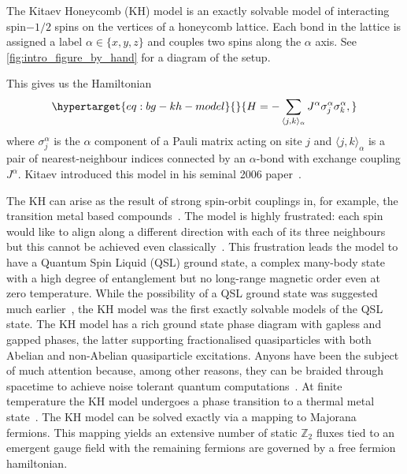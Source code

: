 The Kitaev Honeycomb (KH) model is an exactly solvable model of interacting spin\(-1/2\) spins on the vertices of a honeycomb lattice. Each bond in the lattice is assigned a label \(\alpha \in \{ x, y, z\}\) and couples two spins along the \(\alpha\) axis. See \cref{fig:intro_figure_by_hand} for a diagram of the setup.

This gives us the Hamiltonian \begin{equation}\protect\hypertarget{eq:bg-kh-model}{}{ H =  - \sum_{\langle j,k\rangle_\alpha} J^{\alpha}\sigma_j^{\alpha}\sigma_k^{\alpha}, }\label{eq:bg-kh-model}\end{equation} where \(\sigma^\alpha_j\) is the \(\alpha\) component of a Pauli matrix acting on site \(j\) and \(\langle j,k\rangle_\alpha\) is a pair of nearest-neighbour indices connected by an \(\alpha\)-bond with exchange coupling \(J^\alpha\). Kitaev introduced this model in his seminal 2006 paper~\autocite{kitaevAnyonsExactlySolved2006}.

The KH can arise as the result of strong spin-orbit couplings in, for example, the transition metal based compounds~\autocite{Jackeli2009,HerrmannsAnRev2018,Winter2017,TrebstPhysRep2022,Takagi2019}. The model is highly frustrated: each spin would like to align along a different direction with each of its three neighbours but this cannot be achieved even classically~\autocite{chandraClassicalHeisenbergSpins2010,selaOrderbydisorderSpinorbitalLiquids2014}. This frustration leads the model to have a Quantum Spin Liquid (QSL) ground state, a complex many-body state with a high degree of entanglement but no long-range magnetic order even at zero temperature. While the possibility of a QSL ground state was suggested much earlier~\autocite{Anderson1973}, the KH model was the first exactly solvable models of the QSL state. The KH model has a rich ground state phase diagram with gapless and gapped phases, the latter supporting fractionalised quasiparticles with both Abelian and non-Abelian quasiparticle excitations. Anyons have been the subject of much attention because, among other reasons, they can be braided through spacetime to achieve noise tolerant quantum computations~\autocite{freedmanTopologicalQuantumComputation2003}. At finite temperature the KH model undergoes a phase transition to a thermal metal state~\autocite{selfThermallyInducedMetallic2019}. The KH model can be solved exactly via a mapping to Majorana fermions. This mapping yields an extensive number of static \(\mathbb Z_2\) fluxes tied to an emergent gauge field with the remaining fermions are governed by a free fermion hamiltonian.

